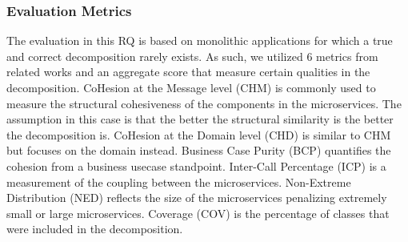 \begin{table}[h]
\caption{Monolithic application data.}\label{tab:monoapps}
\end{table}


\subsubsection{Evaluation Metrics}
The evaluation in this RQ is based on monolithic applications for which a true and correct decomposition rarely exists. As such, we utilized 6 metrics from related works and an aggregate score that measure certain qualities in the decomposition. CoHesion at the Message level (CHM)\cite{jin2021fosci,athanasopoulos2015cohesion} is commonly used to measure the structural cohesiveness of the components in the microservices. The assumption in this case is that the better the structural similarity is the better the decomposition is. CoHesion at the Domain level (CHD)\cite{jin2021fosci,athanasopoulos2015cohesion} is similar to CHM but focuses on the domain instead. Business Case Purity (BCP)\cite{kalia2021mono2micro} quantifies the cohesion from a business usecase standpoint. Inter-Call Percentage (ICP)\cite{kalia2021mono2micro} is a measurement of the coupling between the microservices. Non-Extreme Distribution (NED)\cite{desai2021cogcn} reflects the size of the microservices penalizing extremely small or large microservices. Coverage (COV) is the percentage of classes that were included in the decomposition. 



